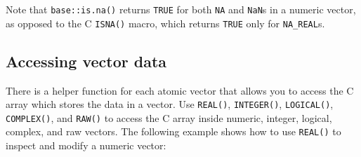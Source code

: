 \begin{Shaded}
\begin{Highlighting}[]
\StringTok{ }\NormalTok{(}\NormalTok{(} \NormalTok{), }


\StringTok{    \}}
\StringTok{  \}}

\NormalTok{)}
\NormalTok{(}\NormalTok{(}
\NormalTok{(}\NormalTok{(}\NormalTok{, }\NormalTok{))}
\NormalTok{(}\NormalTok{(}\NormalTok{, }\NormalTok{))}
\NormalTok{(}\NormalTok{(}\NormalTok{, }\NormalTok{))}
\end{Highlighting}
\end{Shaded}

Note that \texttt{base::is.na()} returns \texttt{TRUE} for both
\texttt{NA} and \texttt{NaN}s in a numeric vector, as opposed to the C
\texttt{ISNA()} macro, which returns \texttt{TRUE} only for
\texttt{NA\_REAL}s.

\subsection{Accessing vector data}

There is a helper function for each atomic vector that allows you to
access the C array which stores the data in a vector. Use
\texttt{REAL()}, \texttt{INTEGER()}, \texttt{LOGICAL()},
\texttt{COMPLEX()}, and \texttt{RAW()} to access the C array inside
numeric, integer, logical, complex, and raw vectors. The following
example shows how to use \texttt{REAL()} to inspect and modify a numeric
vector: 


